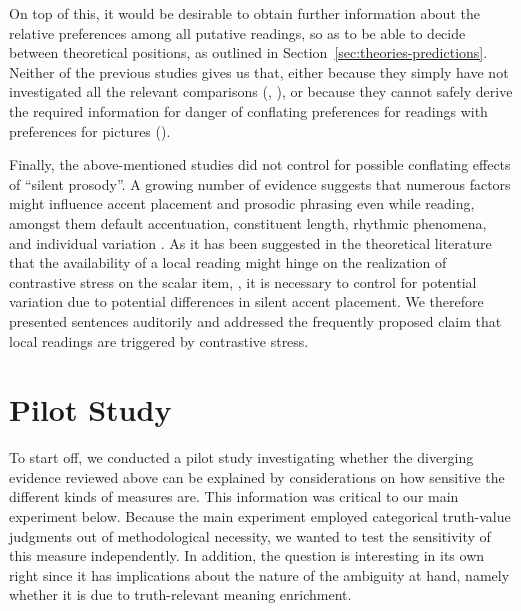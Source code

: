 \documentclass[fleqn,reqno,10pt,draft]{article}
\begin{document}
On top of this, it would be desirable to obtain further information
about the relative preferences among all putative readings, so as to
be able to decide between theoretical positions, as outlined in
Section~\ref{sec:theories-predictions}. Neither of the previous
studies gives us that, either because they simply have not
investigated all the relevant comparisons
(\citet{GeurtsPouscoulous2009:Embedded-Implic},
\citet{CliftonDube2010:Embedded-Implic}), or because they cannot
safely derive the required information for danger of conflating
preferences for readings with preferences for pictures
(\citet{ChemlaSpector2010:Experimental-Ev}).

Finally, the above-mentioned studies did not control for possible
conflating effects of ``silent prosody''. A growing number of evidence
suggests that numerous factors might influence accent placement and
prosodic phrasing even while reading, amongst them default
accentuation, constituent length, rhythmic phenomena, and individual
variation \citep[e.g.][]{Augurzky08,Bader98,Fodor98,Fodor02,Kentner12,
Steinhauer01}. As it has been suggested in the theoretical
literature that the availability of a local reading might hinge on the
realization of contrastive stress on the scalar item,
\citep[e.g.][]{Horn2006:The-Border-Wars,Geurts2009:Scalar-Implicat,Geurts2010:Quantity-Implic,Tielvan-Tiel2012:Embedded-Scalar}, it is necessary to
control for potential variation due to potential differences in silent accent placement.
We therefore presented sentences auditorily and addressed the frequently proposed claim 
that local readings are triggered by contrastive
stress.


\section{Pilot Study}
To start off, we conducted  a pilot study  investigating whether the diverging evidence reviewed above can be explained by considerations on how sensitive the different kinds of measures are. This information was critical to our main experiment below. Because the main experiment employed categorical truth-value judgments out of methodological necessity, we wanted to test the sensitivity of this measure independently. In addition, the question is interesting in its own right since it has implications about the nature of the ambiguity at hand, namely whether it is due to truth-relevant meaning enrichment. 
\end{document}
